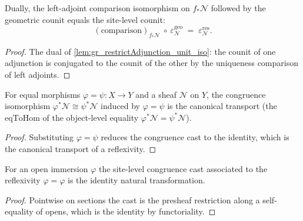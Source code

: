 \begin{lemma}
  \label{lem:gr_restrictIsoPullback_counit}
  Dually, the left-adjoint comparison isomorphism on \(f_{*}\mathcal{N}\) followed by
  the geometric counit equals the site-level counit:
  \[
    (\text{comparison})_{f_{*}\mathcal{N}}\ \circ\ \varepsilon^{\mathrm{geo}}_{\mathcal{N}}
      \;=\; \varepsilon^{\mathrm{res}}_{\mathcal{N}}.
  \]
\end{lemma}
\begin{proof}
  \leanok
  The dual of \cref{lem:gr_restrictAdjunction_unit_iso}: the counit of one adjunction
  is conjugated to the counit of the other by the uniqueness comparison of left
  adjoints.
\end{proof}

\begin{lemma}
  \label{lem:gr_pullbackCongr_hom_eqToHom}
  For equal morphisms \(\varphi = \psi : X \to Y\) and a sheaf \(\mathcal{N}\) on \(Y\),
  the congruence isomorphism \(\varphi^{*}\mathcal{N} \cong \psi^{*}\mathcal{N}\)
  induced by \(\varphi = \psi\) is the canonical transport (the \(\mathrm{eqToHom}\) of
  the object-level equality \(\varphi^{*}\mathcal{N} = \psi^{*}\mathcal{N}\)).
\end{lemma}
\begin{proof}

\leanok
  Substituting \(\varphi = \psi\) reduces the congruence cast to the identity, which is
  the canonical transport of a reflexivity.
\end{proof}

\begin{lemma}
  \label{lem:gr_restrictFunctorCongr_rfl}
  For an open immersion \(\varphi\) the site-level congruence cast associated to the
  reflexivity \(\varphi = \varphi\) is the identity natural transformation.
\end{lemma}
\begin{proof}

\leanok
  Pointwise on sections the cast is the presheaf restriction along a self-equality of
  opens, which is the identity by functoriality.
\end{proof}

